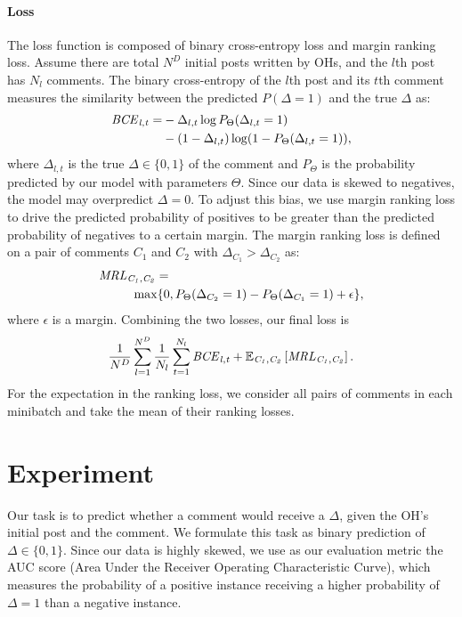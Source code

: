 \documentclass[11pt,a4paper]{article}
\newcommand{\BCE}{\it{BCE}}
\newcommand{\MRL}{\it{MRL}}
\newcommand{\Ndata}{N^{D}}
\begin{document}
\paragraph{Loss} The loss function is composed of binary cross-entropy loss and margin ranking loss. Assume there are total $\Ndata$ initial posts written by OHs, and the $l$th post has $N_l$ comments. The binary cross-entropy of the $l$th post and its $t$th comment measures the similarity between the predicted $P(\Delta = 1)$ and the true $\Delta$ as:
\begin{align*}
\BCE_{l,t} =& - \Delta_{l,t} \log P_\Theta(\Delta_{l,t} = 1) \\
&- (1 - \Delta_{l,t}) \log (1 - P_\Theta(\Delta_{l,t} = 1)),
\end{align*}
where $\Delta_{l,t}$ is the true $\Delta \in \{0, 1\}$ of the comment and $P_\Theta$ is the probability predicted by our model with parameters $\Theta$. 
Since our data is skewed to negatives, the model may overpredict $\Delta = 0$. To adjust this bias, we use margin ranking loss to drive the predicted probability of positives to be greater than the predicted probability of negatives to a certain margin. The margin ranking loss is defined on a pair of comments $C_1$ and $C_2$ with $\Delta_{C_1} > \Delta_{C_2}$ as:
\begin{align*}
&\MRL_{C_1, C_2} = \\
&~~~~~~~~ \max\{0, P_\Theta(\Delta_{C_2} = 1) - P_\Theta(\Delta_{C_1} = 1) + \epsilon \},
\end{align*}
where $\epsilon$ is a margin. Combining the two losses, our final loss is
\begin{align*}
\frac{1}{\Ndata} \sum_{l = 1}^{\Ndata} \frac{1}{N_l} \sum_{t = 1}^{N_l} \BCE_{l,t} + 
\mathbb{E}_{C_1, C_2} \left[ \MRL_{C_1, C_2} \right].
\end{align*}
For the expectation in the ranking loss, we consider all pairs of comments in each minibatch and take the mean of their ranking losses.



\section{Experiment\label{sec:experiment}}

Our task is to predict whether a comment would receive a $\Delta$, given the OH's initial post and the comment. We formulate this task as binary prediction of $\Delta \in \{0, 1\}$. Since our data is highly skewed, we use as our evaluation metric the AUC score (Area Under the Receiver Operating Characteristic Curve), which measures the probability of a positive instance receiving a higher probability of $\Delta = 1$ than a negative instance. 
\end{document}
